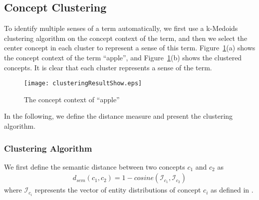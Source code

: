 \subsection{Concept Clustering}
To identify multiple senses of a term automatically, we first use a k-Medoids clustering algorithm on the concept context of the term, and then
we select the center concept in each cluster to represent a sense of this term.  Figure~\ref{fig:clustersOfApp}(a) shows the concept context of
the term ``apple'', and Figure~\ref{fig:clustersOfApp}(b) shows the clustered concepts. It is clear that each cluster represents a sense of the
term.

\begin{figure}[!h]
 \centering
 \texttt{[image: clusteringResultShow.eps]}
 \caption{The concept context of ``apple''}
 \label{fig:clustersOfApp}
\end{figure}

In the following, we define the distance measure and present the
clustering algorithm.



\subsubsection{Clustering Algorithm}
We first define the semantic distance between two concepts $c_1$ and
$c_2$ as
\begin{equation}
\label{eq:semanticDist}
\begin{aligned}
d_{sem}(c_{1}, c_{2}) = 1-cosine(\mathcal{I}_{c_{1}}, \mathcal{I}_{c_{2}})
\end{aligned}
\end{equation}
where $\mathcal{I}_{c_i}$ represents the vector of entity distributions
of concept $c_i$ as defined in .

